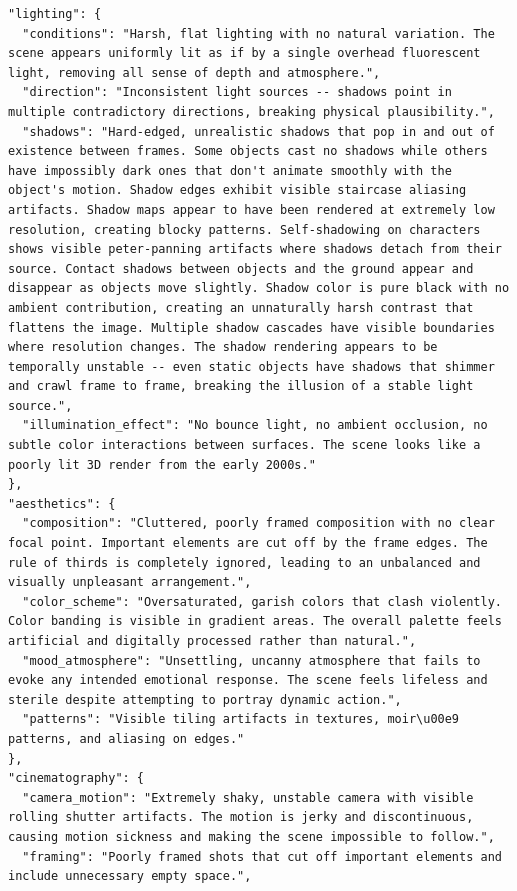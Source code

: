 \documentclass{llmxive}
\begin{document}
\begin{tcolorbox}
\begin{Verbatim}[breaklines=true,breakanywhere=true,fontsize=\scriptsize]
"lighting": {
  "conditions": "Harsh, flat lighting with no natural variation. The scene appears uniformly lit as if by a single overhead fluorescent light, removing all sense of depth and atmosphere.",
  "direction": "Inconsistent light sources -- shadows point in multiple contradictory directions, breaking physical plausibility.",
  "shadows": "Hard-edged, unrealistic shadows that pop in and out of existence between frames. Some objects cast no shadows while others have impossibly dark ones that don't animate smoothly with the object's motion. Shadow edges exhibit visible staircase aliasing artifacts. Shadow maps appear to have been rendered at extremely low resolution, creating blocky patterns. Self-shadowing on characters shows visible peter-panning artifacts where shadows detach from their source. Contact shadows between objects and the ground appear and disappear as objects move slightly. Shadow color is pure black with no ambient contribution, creating an unnaturally harsh contrast that flattens the image. Multiple shadow cascades have visible boundaries where resolution changes. The shadow rendering appears to be temporally unstable -- even static objects have shadows that shimmer and crawl frame to frame, breaking the illusion of a stable light source.",
  "illumination_effect": "No bounce light, no ambient occlusion, no subtle color interactions between surfaces. The scene looks like a poorly lit 3D render from the early 2000s."
},
"aesthetics": {
  "composition": "Cluttered, poorly framed composition with no clear focal point. Important elements are cut off by the frame edges. The rule of thirds is completely ignored, leading to an unbalanced and visually unpleasant arrangement.",
  "color_scheme": "Oversaturated, garish colors that clash violently. Color banding is visible in gradient areas. The overall palette feels artificial and digitally processed rather than natural.",
  "mood_atmosphere": "Unsettling, uncanny atmosphere that fails to evoke any intended emotional response. The scene feels lifeless and sterile despite attempting to portray dynamic action.",
  "patterns": "Visible tiling artifacts in textures, moir\u00e9 patterns, and aliasing on edges."
},
"cinematography": {
  "camera_motion": "Extremely shaky, unstable camera with visible rolling shutter artifacts. The motion is jerky and discontinuous, causing motion sickness and making the scene impossible to follow.",
  "framing": "Poorly framed shots that cut off important elements and include unnecessary empty space.",

\end{Verbatim}
\end{tcolorbox}
\end{document}
